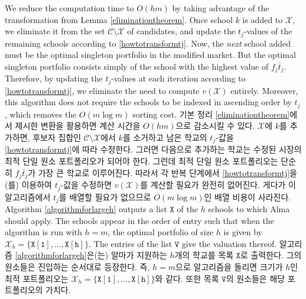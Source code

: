 \documentclass[11pt]{article} %
\theoremstyle{definition}
\theoremstyle{definition}
\begin{document}
\ifen 
We reduce the computation time to $O(hm)$ by taking advantage of the transformation from Lemma \ref{eliminationtheorem}. Once school $k$ is added to $\mathcal{X}$, we eliminate it from the set $\mathcal{C}\setminus \mathcal{X}$ of candidates, and update the $t_j$-values of the remaining schools according to \eqref{howtotransformtj}. Now, the \emph{next} school added must be the optimal singleton portfolio in the modified market. But the optimal singleton portfolio consists simply of the school with the highest value of $f_j \bar t_j$. Therefore, by updating the $t_j$-values at each iteration according to \eqref{howtotransformtj}, we eliminate the need to compute $v(\mathcal{X})$ entirely. Moreover, this algorithm does not require the schools to be indexed in ascending order by $t_j$, which removes the $O(m\log m)$ sorting cost.
\else
기본 정리 \ref{eliminationtheorem}에서 제시한 변환을 활용하면 계산 시간을 $O(hm)$으로 감소시킬 수 있다. $\mathcal{X}$에 $k$를 추가하면, 후보자 집합인 $\mathcal{C}\setminus \mathcal{X}$에서 $k$를 소거하고 남은 학교의 $t_j$-값을 \eqref{howtotransformtj}에 따라 수정한다. 그러면 다음으로 추가하는 학교는 수정된 시장의 최적 단일 원소 포트폴리오가 되어야 한다. 그런데 최적 단일 원소 포트폴리오는 단순히 $f_j \bar t_j$가 가장 큰 학교로 이루어진다. 따라서 각 반복 단계에서 \eqref{howtotransformtj}을(를) 이용하여 $t_j$-값을 수정하면 $v(\mathcal{X})$를 계산할 필요가 완전히 없어진다. 게다가 이 알고리즘에서 $t_j$를 배열할 필요가 없으므로 $O(m\log m)$인 배열 비용이 사라진다. \fi
\ifen
Algorithm \ref{algorithmforlargeh} outputs a list $\mathtt{X}$ of the $h$ schools to which Alma should apply. The schools appear in the order of entry such that when the algorithm is run with $h=m$, the optimal portfolio of size $h$ is given by $\mathcal{X}_h = \{\mathtt{X[1]}, \dots, \mathtt{X[h]}\}$. The entries of the list $\mathtt{V}$ give the valuation thereof. 
\else
알고리즘 \ref{algorithmforlargeh}은(는) 알마가 지원하는 $h$개의 학교를 목록 $\mathtt{X}$로 출력한다. 그의 원소들은 진입하는 순서대로 등장한다. 즉, $h=m$으로 알고리즘을 돌리면 크기가 $h$인 최적 포트폴리오는 $\mathcal{X}_h = \{\mathtt{X[1]}, \dots, \mathtt{X[h]}\}$와 같다. 또한 목록 $\mathtt{V}$의 원소들은 해당 포트폴리오의 가치다. \fi
\end{document}
